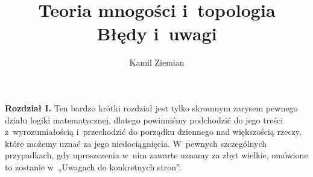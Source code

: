 \documentclass[a4paper,11pt]{article}
\title{Teoria mnogości i~topologia \\
  {\Large Błędy i~uwagi}}
\author{Kamil Ziemian}
\begin{document}





\maketitle  %












\vspace{0em}



\vspace{0em}


\noindent
\textbf{Rozdział I.} Ten bardzo krótki rozdział jest tylko skromnym zarysem
pewnego działu logiki matematycznej, dlatego powinniśmy podchodzić do jego
treści z~wyrozumiałością i~przechodzić do porządku dziennego nad większością
rzeczy, które możemy uznać za jego niedociągnięcia. W~pewnych szczególnych
przypadkach, gdy uproszczenia w~nim zawarte uznamy za zbyt wielkie, omówione
to zostanie w~„Uwagach do konkretnych stron”.

\vspace{\spaceFour}












\vspace{0em}
\end{document}
